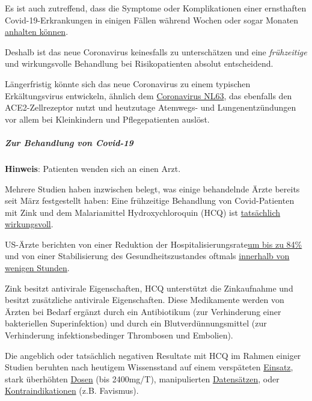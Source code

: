 Es ist auch zutreffend, dass die Symptome oder Komplikationen einer
ernsthaften Covid-19-Erkrankungen in einigen Fällen während Wochen oder
sogar Monaten
\href{https://www.theatlantic.com/health/archive/2020/06/covid-19-coronavirus-longterm-symptoms-months/612679/}{anhalten
können}.

Deshalb ist das neue Coronavirus keinesfalls zu unterschätzen und eine
\emph{frühzeitige} und wirkungsvolle Behandlung bei Risikopatienten
absolut entscheidend.

Längerfristig könnte sich das neue Coronavirus zu einem typischen
Erkältungsvirus entwickeln, ähnlich dem
\href{https://en.wikipedia.org/wiki/Human_coronavirus_NL63}{Coronavirus
NL63}, das ebenfalls den ACE2-Zellrezeptor nutzt und heutzutage
Atemwegs- und Lungenentzündungen vor allem bei Kleinkindern und
Pflegepatienten auslöst.

\hypertarget{zur-behandlung-von-covid-19-1}{%
\subparagraph{\texorpdfstring{\textbf{Zur Behandlung von
Covid-19}}{Zur Behandlung von Covid-19}}\label{zur-behandlung-von-covid-19-1}}

\textbf{Hinweis}: Patienten wenden sich an einen Arzt.

Mehrere Studien haben inzwischen belegt, was einige behandelnde Ärzte
bereits seit März festgestellt haben: Eine frühzeitige Behandlung von
Covid-Patienten mit Zink und dem Malariamittel Hydroxychloroquin (HCQ)
ist \href{https://swprs.org/zur-behandlung-von-covid-19/}{tatsächlich
wirkungsvoll}.

US-Ärzte berichten von einer Reduktion der
Hospitalisierungsrate\href{https://www.preprints.org/manuscript/202007.0025/v1}{um
bis zu 84\%} und von einer Stabilisierung des Gesundheits­zustandes
oftmals \href{https://www.youtube.com/watch?v=eVs_EWVCVPc}{innerhalb von
wenigen Stunden}.

Zink besitzt antivirale Eigenschaften, HCQ unterstützt die Zinkaufnahme
und besitzt zusätzliche antivirale Eigenschaften. Diese Medikamente
werden von Ärzten bei Bedarf ergänzt durch ein Antibiotikum (zur
Verhinderung einer bakteriellen Superinfektion) und durch ein
Blutverdünnungsmittel (zur Verhinderung infektionsbedinger Thrombosen
und Embolien).

Die angeblich oder tatsächlich negativen Resultate mit HCQ im Rahmen
einiger Studien beruhten nach heutigem Wissensstand auf einem
verspäteten \href{https://c19study.com/}{Einsatz}, stark überhöhten
\href{http://www.francesoir.fr/politique-monde/oxford-recovery-et-solidarity-overdosage-two-clinical-trials-acts-considered}{Dosen}
(bis 2400mg/T), manipulierten
\href{https://www.theguardian.com/world/2020/jun/03/covid-19-surgisphere-who-world-health-organization-hydroxychloroquine}{Datensätzen},
oder
\href{https://www.iss.it/en/rapporti-covid-19/-/asset_publisher/btw1J82wtYzH/content/id/5334891}{Kontraindikationen}
(z.B. Favismus).

